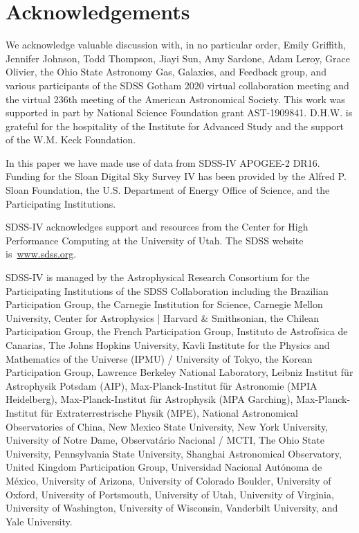 \documentclass[fleqn, usenatbib]{mnras}
\begin{document}
\section{Acknowledgements} 
\label{sec:acknowledgements} 
We acknowledge valuable discussion with, in no particular order, Emily 
Griffith, Jennifer Johnson, Todd Thompson, Jiayi Sun, Amy Sardone, Adam Leroy, 
Grace Olivier, the Ohio State Astronomy Gas, Galaxies, and Feedback group, and 
various participants of the SDSS Gotham 2020 virtual collaboration meeting and 
the virtual 236th meeting of the American Astronomical Society. This work was 
supported in part by National Science Foundation grant AST-1909841. D.H.W. 
is grateful for the hospitality of the Institute for Advanced Study and the 
support of the W.M. Keck Foundation. 
\par 
In this paper we have made use of data from SDSS-IV APOGEE-2 DR16. 
Funding for the Sloan Digital Sky 
Survey IV has been provided by the 
Alfred P. Sloan Foundation, the U.S. 
Department of Energy Office of 
Science, and the Participating 
Institutions. 
\par 
SDSS-IV acknowledges support and 
resources from the Center for High 
Performance Computing  at the 
University of Utah. The SDSS 
website is~\url{www.sdss.org}.
\par 
SDSS-IV is managed by the 
Astrophysical Research Consortium 
for the Participating Institutions 
of the SDSS Collaboration including 
the Brazilian Participation Group, 
the Carnegie Institution for Science, 
Carnegie Mellon University, Center for 
Astrophysics | Harvard \& 
Smithsonian, the Chilean Participation 
Group, the French Participation Group, 
Instituto de Astrof\'isica de 
Canarias, The Johns Hopkins 
University, Kavli Institute for the 
Physics and Mathematics of the 
Universe (IPMU) / University of 
Tokyo, the Korean Participation Group, 
Lawrence Berkeley National Laboratory, 
Leibniz Institut f\"ur Astrophysik 
Potsdam (AIP),  Max-Planck-Institut 
f\"ur Astronomie (MPIA Heidelberg), 
Max-Planck-Institut f\"ur 
Astrophysik (MPA Garching), 
Max-Planck-Institut f\"ur 
Extraterrestrische Physik (MPE), 
National Astronomical Observatories of 
China, New Mexico State University, 
New York University, University of 
Notre Dame, Observat\'ario 
Nacional / MCTI, The Ohio State 
University, Pennsylvania State 
University, Shanghai 
Astronomical Observatory, United 
Kingdom Participation Group, 
Universidad Nacional Aut\'onoma 
de M\'exico, University of Arizona, 
University of Colorado Boulder, 
University of Oxford, University of 
Portsmouth, University of Utah, 
University of Virginia, University 
of Washington, University of 
Wisconsin, Vanderbilt University, 
and Yale University.
\end{document}
